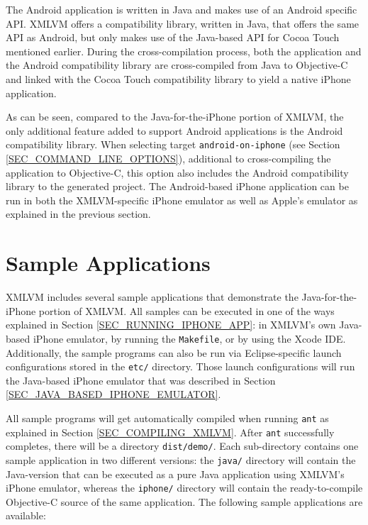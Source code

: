 \documentclass[11pt]{book}
\begin{document}
The Android application is written in Java and makes use of an Android
specific API. XMLVM offers a compatibility library, written in Java,
that offers the same API as Android, but only makes use of the
Java-based API for Cocoa Touch mentioned earlier. During the
cross-compilation process, both the application and the Android
compatibility library are cross-compiled from Java to Objective-C and
linked with the Cocoa Touch compatibility library to yield a native
iPhone application.

As can be seen, compared to the Java-for-the-iPhone portion of XMLVM,
the only additional feature added to support Android applications is
the Android compatibility library. When selecting target
\texttt{android-on-iphone} (see Section
\ref{SEC_COMMAND_LINE_OPTIONS}), additional to cross-compiling the
application to Objective-C, this option also includes the Android
compatibility library to the generated project.  The Android-based
iPhone application can be run in both the XMLVM-specific iPhone
emulator as well as Apple's emulator as explained in the previous
section.


\section{Sample Applications}
\label{SEC_IPHONE_SAMPLE_APPS}

XMLVM includes several sample applications that demonstrate the
Java-for-the-iPhone portion of XMLVM. All samples can be executed in
one of the ways explained in Section \ref{SEC_RUNNING_IPHONE_APP}: in
XMLVM's own Java-based iPhone emulator, by running the
\texttt{Makefile}, or by using the Xcode IDE. Additionally, the sample
programs can also be run via Eclipse-specific launch configurations
stored in the \texttt{etc/} directory. Those launch configurations
will run the Java-based iPhone emulator that was described in Section
\ref{SEC_JAVA_BASED_IPHONE_EMULATOR}.

All sample programs will get automatically compiled when running \texttt{ant}
as explained in Section \ref{SEC_COMPILING_XMLVM}. After \texttt{ant}
successfully completes, there will be a directory \texttt{dist/demo/}.
Each sub-directory contains one sample application in two different
versions: the \texttt{java/} directory will contain the Java-version
that can be executed as a pure Java application using XMLVM's iPhone
emulator, whereas the \texttt{iphone/} directory will contain the
ready-to-compile Objective-C source of the same application. The
following sample applications are available:
\end{document}
